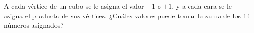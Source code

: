 A cada vértice de un cubo se le asigna el valor $-1$ o $+1$, y a cada cara se le asigna el producto de sus vértices. ¿Cuáles valores puede tomar la suma de los 14 números asignados?